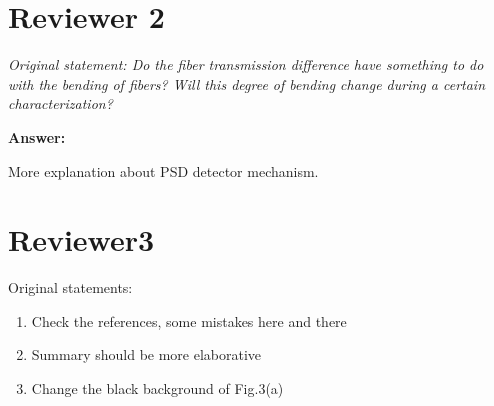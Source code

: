 \documentclass[]{article}
\begin{document}
\section{Reviewer 2}
\textit{Original statement: Do the fiber transmission difference have something to do with the bending of fibers?
Will this degree of bending change during a certain characterization?}\newline

\textbf{Answer:}\newline


More explanation about PSD detector mechanism.

\section{Reviewer3}
Original statements:
\begin{enumerate}
	\item Check the references, some mistakes here and there
	\item Summary should be more elaborative
	\item Change the black background of Fig.3(a)
\end{enumerate}
\end{document}
